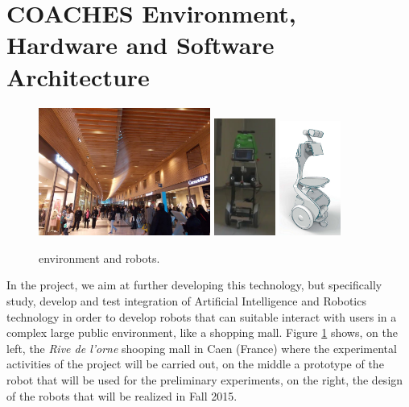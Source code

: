 \section{COACHES Environment, Hardware and Software Architecture}
\vspace{-0.1cm}
\begin{figure}[t!]
\centering
\includegraphics[height=4.2cm]{fig/rivedelorne}\hspace{0.1cm}\hfill
\includegraphics[width=0.18\textwidth]{fig/diago1}\hspace{0.1cm}\hfill
\includegraphics[width=0.18\textwidth]{fig/coaches_robot}
\caption{\coaches environment and robots.}
\label{fig:env}
\end{figure}

In the \coaches project, we aim at further developing this technology, but specifically study, develop and test integration of Artificial Intelligence and Robotics technology in order to develop robots that can suitable interact with users in a complex large public environment, like a shopping mall.
Figure \ref{fig:env} shows, on the left, the \emph{Rive de l'orne} shooping mall in Caen (France) where the experimental activities of the project will be carried out, on the middle a prototype of the robot that will be used for the preliminary experiments, on the right, the design of the robots that will be realized in Fall 2015.

